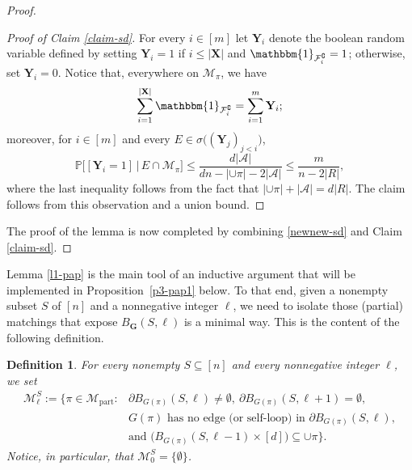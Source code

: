 \documentclass[11pt,leqno]{amsart}
\newtheorem{definition}[theorem]{Definition}
\theoremstyle{remark}
\theoremstyle{plain}
\begin{document}
\begin{proof}
\begin{proof}[Proof of Claim \ref{claim-sd}]
For every $i\in [m]$ let $\mathbf{Y}_i$ denote the boolean random variable defined by setting $\mathbf{Y}_i=1$ if
$i\leqslant |\mathbf{X}|$ and $\mathbbm{1}_{\mathcal{F}_i^\complement}=1$; otherwise, set $\mathbf{Y}_i=0$.
Notice that, everywhere on $\mathcal{M}_\pi$, we have
\[ \sum_{i=1}^{|\mathbf{X}|} \mathbbm{1}_{\mathcal{F}_i^\complement} =\sum_{i=1}^m \mathbf{Y}_i; \]
moreover, for $i\in [m]$ and every $E\in \sigma\big( (\mathbf{Y}_j)_{j<i}\big)$,
\[ \mathbb{P}\big[ [\mathbf{Y}_i=1] \, \big|\, E\cap\mathcal{M}_\pi \big] \leqslant \frac{d|\mathcal{A}|}{dn-|\cup\pi|-2|\mathcal{A}|}
\leqslant \frac{m}{n-2|R|}, \]
where the last inequality follows from the fact that $|\cup\pi|+|\mathcal{A}|=d|R|$. The claim follows from this
observation and a union bound.
\end{proof}
The proof of the lemma is now completed by combining \eqref{newnew-sd} and Claim \ref{claim-sd}.
\end{proof}
Lemma \ref{l1-pap} is the main tool of an inductive argument that will be implemented in Proposition~\ref{p3-pap1} below.
To that end, given a nonempty subset $S$ of $[n]$ and a nonnegative integer $\ell$, we need to isolate
those (partial) matchings that expose $B_{\mathbf{G}}(S,\ell)$ is a minimal way. This is the content of the following
definition.
\begin{definition}
For every nonempty $S\subseteq [n]$ and every nonnegative integer $\ell$, we set
\begin{align*}
\mathcal{M}^S_\ell := \Big\{ \pi\in\mathcal{M}_\mathrm{part} \colon  &
\partial B_{G(\pi)}(S,\ell) \neq\emptyset, \ \partial B_{G(\pi)}(S,\ell+1)=\emptyset, \\
& G(\pi) \text{ has no edge (or self-loop) in } \partial B_{G(\pi)}(S,\ell), \\
& \text{and } \big(B_{G(\pi)}(S,\ell-1)\times [d]\big) \subseteq \cup\pi \Big\}.
\end{align*}
Notice, in particular, that $\mathcal{M}^S_0=\{\emptyset\}$.
\end{definition}
\end{document}
